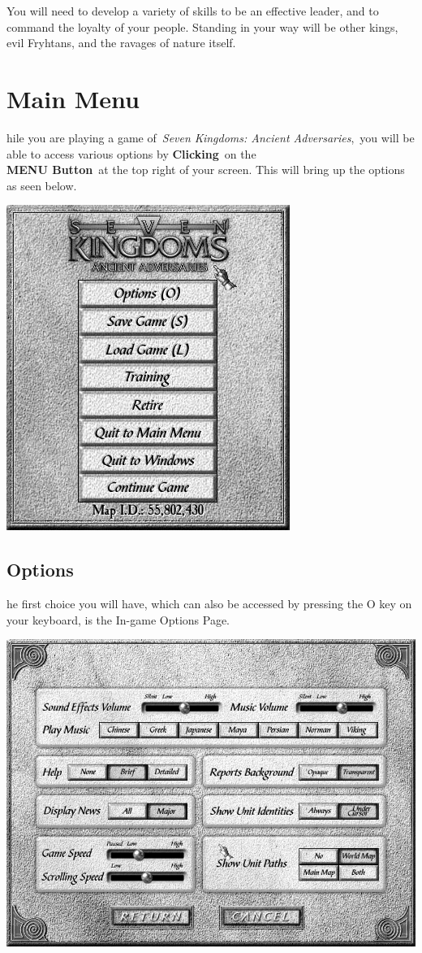 You will need to develop a variety of skills to be an effective leader, and to command the loyalty of your people. Standing in your way will be other kings, evil Fryhtans, and the ravages of nature itself.

\section{Main Menu}

hile you are playing a game of \textit{Seven Kingdoms: Ancient Adversaries}, you will be able to access various options by \textbf{Clicking} on the \\ %
\textbf{MENU Button} at the top right of your screen. This will bring up the options as seen below.


\begin{center}
\includegraphics[width=0.5\linewidth]{Imainmenu}
\end{center}

\subsection{Options}

he first choice you will have, which can also be accessed by pressing the O key on your keyboard, is the In-game Options Page.

\begin{center}
	\includegraphics[width=0.7\linewidth]{Ioptions}
\end{center}

